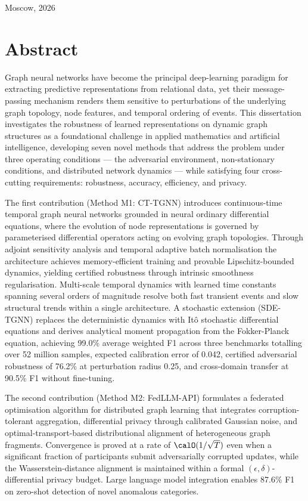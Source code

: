 \begin{titlepage}
\begin{center}
\vfill
{\small Moscow, 2026}
\end{center}
\end{titlepage}


\chapter*{Abstract}

Graph neural networks have become the principal deep-learning paradigm for extracting predictive representations from relational data, yet their message-passing mechanism renders them sensitive to perturbations of the underlying graph topology, node features, and temporal ordering of events. This dissertation investigates the robustness of learned representations on dynamic graph structures as a foundational challenge in applied mathematics and artificial intelligence, developing seven novel methods that address the problem under three operating conditions — the adversarial environment, non-stationary conditions, and distributed network dynamics — while satisfying four cross-cutting requirements: robustness, accuracy, efficiency, and privacy.

The first contribution (Method M1: CT-TGNN) introduces continuous-time temporal graph neural networks grounded in neural ordinary differential equations, where the evolution of node representations is governed by parameterised differential operators acting on evolving graph topologies. Through adjoint sensitivity analysis and temporal adaptive batch normalisation the architecture achieves memory-efficient training and provable Lipschitz-bounded dynamics, yielding certified robustness through intrinsic smoothness regularisation. Multi-scale temporal dynamics with learned time constants spanning several orders of magnitude resolve both fast transient events and slow structural trends within a single architecture. A stochastic extension (SDE-TGNN) replaces the deterministic dynamics with It\^{o} stochastic differential equations and derives analytical moment propagation from the Fokker-Planck equation, achieving 99.0\% average weighted F1 across three benchmarks totalling over 52 million samples, expected calibration error of 0.042, certified adversarial robustness of 76.2\% at perturbation radius 0.25, and cross-domain transfer at 90.5\% F1 without fine-tuning.

The second contribution (Method M2: FedLLM-API) formulates a federated optimisation algorithm for distributed graph learning that integrates corruption-tolerant aggregation, differential privacy through calibrated Gaussian noise, and optimal-transport-based distributional alignment of heterogeneous graph fragments. Convergence is proved at a rate of $\calO(1/\sqrt{T})$ even when a significant fraction of participants submit adversarially corrupted updates, while the Wasserstein-distance alignment is maintained within a formal $(\epsilon,\delta)$-differential privacy budget. Large language model integration enables 87.6\% F1 on zero-shot detection of novel anomalous categories.

